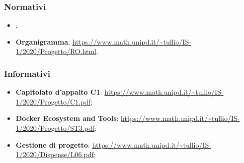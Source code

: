 \subsubsection{Normativi}
\begin{itemize}
    \item \NdPv{};
    \item \textbf{Organigramma}: \url{https://www.math.unipd.it/~tullio/IS-1/2020/Progetto/RO.html}.
\end{itemize}

\subsubsection{Informativi}
\begin{itemize}
    \item \textbf{Capitolato d'appalto C1}: \url{https://www.math.unipd.it/~tullio/IS-1/2020/Progetto/C1.pdf};
    \item \textbf{Docker Ecosystem and Tools}: \url{https://www.math.unipd.it/~tullio/IS-1/2020/Progetto/ST3.pdf};
    \item \textbf{Gestione di progetto}: \url{https://www.math.unipd.it/~tullio/IS-1/2020/Dispense/L06.pdf};
\end{itemize}
